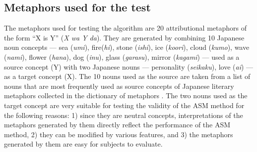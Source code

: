 \subsection{Metaphors used for the test} \label{subsec:material}
The metaphors used for testing the algorithm are 20 attributional metaphors
of the form ``X is Y'' ({\it X wa Y da}). 
They are generated by combining 10 Japanese noun concepts ---
sea ({\it umi}), fire({\it hi}), stone ({\it ishi}), ice ({\it koori}), 
cloud ({\it kumo}), wave ({\it nami}), flower ({\it hana}), dog ({\it inu}), 
glass ({\it garasu}), mirror ({\it kagami}) ---
used as a source concept (Y) with two Japanese nouns ---
personality ({\it seikaku}), love ({\it ai}) ---
as a target concept (X).
The 10 nouns used as the source are taken from a list of nouns 
that are most frequently used as source concepts of Japanese literary 
metaphors collected in the dictionary of metaphors \cite{Nakamura77}. 
The two nouns used as the target concept are very suitable for 
testing the validity of the ASM method for the following reasons:
1) since they are neutral concepts, interpretations of the metaphors 
generated by them directly reflect the performance of the ASM method, 
2) they can be modified by various features, and 
3) the metaphors generated by them are easy for subjects to evaluate.

